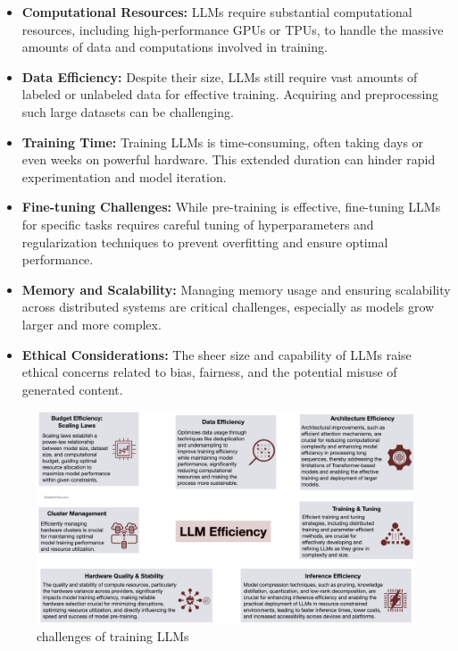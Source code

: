 \begin{itemize}
    \item \textbf{Computational Resources:} LLMs require substantial computational resources, including high-performance GPUs or TPUs, to handle the massive amounts of data and computations involved in training.
    
    \item \textbf{Data Efficiency:} Despite their size, LLMs still require vast amounts of labeled or unlabeled data for effective training. Acquiring and preprocessing such large datasets can be challenging.
    
    \item \textbf{Training Time:} Training LLMs is time-consuming, often taking days or even weeks on powerful hardware. This extended duration can hinder rapid experimentation and model iteration.
    
    \item \textbf{Fine-tuning Challenges:} While pre-training is effective, fine-tuning LLMs for specific tasks requires careful tuning of hyperparameters and regularization techniques to prevent overfitting and ensure optimal performance.
    
    \item \textbf{Memory and Scalability:} Managing memory usage and ensuring scalability across distributed systems are critical challenges, especially as models grow larger and more complex.
    
    \item \textbf{Ethical Considerations:} The sheer size and capability of LLMs raise ethical concerns related to bias, fairness, and the potential misuse of generated content.
\end{itemize}

\begin{figure}[h!]
	\centering
	\includegraphics[scale=0.2]{figures/llm computational resources.jpeg}
	\caption{challenges of training LLMs }
\end{figure}
\newpage

